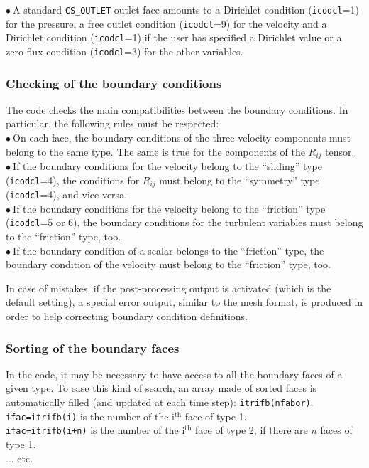 $\bullet\ $A standard \texttt{CS\_OUTLET} outlet face amounts to a Dirichlet
condition (\texttt{icodcl}=1) for the pressure, a free outlet condition
(\texttt{icodcl}=9) for the velocity and a Dirichlet condition
(\texttt{icodcl}=1) if the user has specified a Dirichlet value or a zero-flux
condition (\texttt{icodcl}=3) for the other variables.\\

\subsubsection{Checking of the boundary conditions}

The code checks the main compatibilities between the boundary
conditions. In particular, the following rules must be respected: \\
$\bullet\ $On each face, the boundary conditions of the three velocity components must belong to the same type. The same is true for the components of the $R_{ij}$ tensor.\\
$\bullet\ $If the boundary conditions for the velocity belong to the
``sliding'' type (\texttt{icodcl}=4), the conditions for $R_{ij}$ must belong to
the ``symmetry'' type (\texttt{icodcl}=4), and vice versa.\\
$\bullet\ $If the boundary conditions for the velocity belong to the
``friction'' type (\texttt{icodcl}=5 or 6), the boundary conditions for the turbulent variables
must belong to the ``friction'' type, too.\\
$\bullet\ $If the boundary condition of a scalar belongs to the
``friction'' type, the boundary condition of the velocity must belong to
the ``friction'' type, too.

In case of mistakes, if the post-processing output is activated (which is the default setting),
a special error output, similar to the mesh format, is produced in order to help
correcting boundary condition definitions.

\subsubsection{Sorting of the boundary faces}

In the code, it may be necessary to have access to all the boundary
faces of a given type. To ease this kind of search, an array made of
sorted faces is automatically filled (and updated at each time step):
\texttt{itrifb(nfabor)}.\\
\texttt{ifac=itrifb(i)} is the number of the i$^{\text{th}}$  face of type
1.\\
\texttt{ifac=itrifb(i+n)} is the number of the i$^{\text{th}}$ face of type
2, if there are $n$ faces of type 1.\\
... etc.

